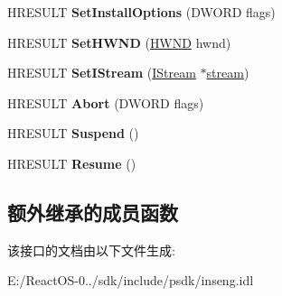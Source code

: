 \begin{DoxyCompactItemize}
H\+R\+E\+S\+U\+LT {\bfseries Set\+Install\+Options} (D\+W\+O\+RD flags)
\item 
\mbox{\label{interface_i_install_engine_afb26a6eca7463d6cf6b5c7912b564700}} 
H\+R\+E\+S\+U\+LT {\bfseries Set\+H\+W\+ND} (\hyperlink{interfacevoid}{H\+W\+ND} hwnd)
\item 
\mbox{\label{interface_i_install_engine_a18a11597627d9a88cb374acf6dc4b2d5}} 
H\+R\+E\+S\+U\+LT {\bfseries Set\+I\+Stream} (\hyperlink{interface_i_stream}{I\+Stream} $\ast$\hyperlink{structstream}{stream})
\item 
\mbox{\label{interface_i_install_engine_a11b690456d3b1e433cc7d452811364a9}} 
H\+R\+E\+S\+U\+LT {\bfseries Abort} (D\+W\+O\+RD flags)
\item 
\mbox{\label{interface_i_install_engine_a363acb02a7e0f5dc9da18b432a30a6eb}} 
H\+R\+E\+S\+U\+LT {\bfseries Suspend} ()
\item 
\mbox{\label{interface_i_install_engine_a9860b247f30195d2a1e63ac97cdd16b5}} 
H\+R\+E\+S\+U\+LT {\bfseries Resume} ()
\end{DoxyCompactItemize}
\subsection*{额外继承的成员函数}


该接口的文档由以下文件生成\+:\begin{DoxyCompactItemize}
\item 
E\+:/\+React\+O\+S-\/0../sdk/include/psdk/inseng.\+idl\end{DoxyCompactItemize}
